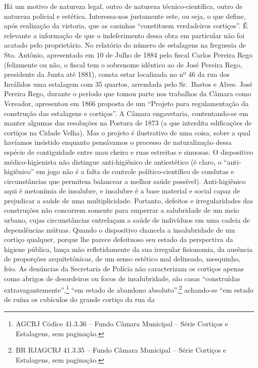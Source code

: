 Há um motivo de natureza legal, outro de natureza técnico-científica,
outro de natureza policial e estética. Interessa-nos justamente este, ou
seja, o que define, após realização da vistoria, que as casinhas
``constituem verdadeiros cortiços''. É relevante a informação de que o
indeferimento dessa obra em particular não foi acatado pelo
proprietário. No relatório do número de estalagens na freguesia de Sto.
Antônio, apresentado em 10 de Julho de 1884 pelo fiscal Carlos Pereira
Rego (felizmente ou não, o fiscal tem o sobrenome idêntico ao de José
Pereira Rego, presidente da Junta até 1881), consta estar localizada no
nº 46 da rua dos Inválidos uma estalagem com 35 quartos, arrendada pelo
Sr.~Bastos e Alves. José Pereira Rego, durante o período que tomou parte
nos trabalhos da Câmara como Vereador, apresentou em 1866 proposta de um
``Projeto para regulamentação da construção das estalagens e cortiços''.
A Câmara engavetaria, contentando-se em manter algumas das resoluções na
Postura de 1873 (a que interdita edificações de cortiços na Cidade
Velha). Mas o projeto é ilustrativo de uma coisa, sobre a qual havíamos
insistido enquanto pensávamos o processo de naturalização dessa espécie
de contiguidade entre mau cheiro e ruas estreitas e sinuosas. O
dispositivo médico-higienista não distingue anti-higiênico de
antiestético (é claro, o ``anti-higiênico'' em jogo não é a falta de
controle político-científico de condutas e circunstâncias que permitem
balancear a melhor saúde possível). Anti-higiênico aqui é metonímia de
insalubre, e insalubre é a base material e social capaz de prejudicar a
saúde de uma multiplicidade. Portanto, defeitos e irregularidades das
construções não concorrem somente para emperrar a salubridade de um meio
urbano, cujas circunstâncias entrelaçam a saúde de indivíduos em uma
cadeia de dependências mútuas. Quando o dispositivo chancela a
insalubridade de um cortiço qualquer, porque lhe parece defeituoso seu
estado da perspectiva da higiene pública, lança mão refletidamente da
sua irregular fisionomia, da ausência de proporções arquitetônicas, de
um senso estético mal delineado, mesquinho, feio. As denúncias da
Secretaria de Polícia não caracterizam os cortiços apenas como abrigos
de desordeiros ou focos de insalubridade, são casas ``construídas
extravagantemente'',\footnote{AGCRJ Códice 41.3.36 -- Fundo Câmara
  Municipal -- Série Cortiços e Estalagens, sem paginação.} ``em estado
de abandono absoluto'',\footnote{BR RJAGCRJ 41.3.35 -- Fundo Câmara
  Municipal -- Série Cortiços e Estalagens, sem paginação.} achando-se
``em estado de ruína os cubículos do grande cortiço da rua da
